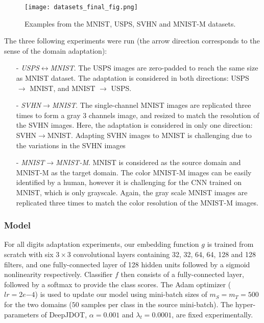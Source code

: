 \documentclass[runningheads]{llncs}
\begin{document}
\begin{figure}
\centering
\texttt{[image: datasets\_final\_fig.png]}
\caption{Examples from the MNIST, USPS, SVHN and MNIST-M datasets.}
\label{fig:datasets}
\end{figure}


\noindent The three following experiments were run (the arrow direction corresponds to the sense of the domain adaptation):
\begin{itemize}
\item[-] \emph{USPS$\leftrightarrow$MNIST}. The USPS images are zero-padded to reach the same size as MNIST dataset.
The adaptation is considered in both directions: USPS $\rightarrow$ MNIST, and MNIST $\rightarrow$ USPS.

\item[-] \emph{SVHN$\rightarrow$MNIST}. The single-channel MNIST images are replicated three times to form a gray 3 channels image, and resized to match the resolution of the SVHN images. Here, the adaptation is considered in only one direction: SVHN$\rightarrow$MNIST. Adapting SVHN images to MNIST is challenging due to the variations in the SVHN images \cite{Ganin2016}  
\item[-] \emph{MNIST$\rightarrow$MNIST-M}. MNIST is considered as the source domain and MNIST-M as the target domain. The color MNIST-M images can be easily identified by a human, however it is challenging for the CNN trained on MNIST, which is only grayscale. Again, the gray scale MNIST images are replicated three times to match the color resolution of the MNIST-M images.
\end{itemize}

\subsubsection*{Model} For all digits adaptation experiments, our embedding function $g$ is trained from scratch with six $3\times3$ convolutional layers containing 32, 32, 64, 64, 128 and 128 filters, and one fully-connected layer of 128 hidden units followed by a sigmoid nonlinearity respectively. Classifier $f$ then consists of a fully-connected layer, followed by a softmax to provide the class scores.
The Adam optimizer ($lr = 2e{-4}$) is used to update our model using mini-batch sizes of $m_S = m_T = 500$ for the two domains ($50$ samples per class in the source mini-batch). The hyper-parameters of DeepJDOT, $\alpha = 0.001$ and $\lambda_t = 0.0001$, are fixed experimentally. 
\end{document}
